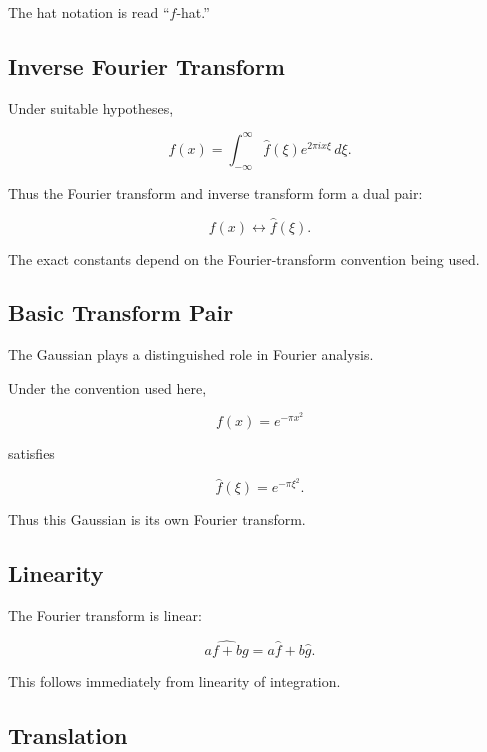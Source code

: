 The hat notation is read ``\(f\)-hat.''

\subsection{Inverse Fourier Transform}
\label{subsec:inverse-fourier-transform}

Under suitable hypotheses,

\[
\boxed{
f(x)
=
\int_{-\infty}^{\infty}
\widehat{f}(\xi)
e^{2\pi i x\xi}
\,d\xi.
}
\]

Thus the Fourier transform and inverse transform form a dual pair:

\[
\boxed{
f(x)
\longleftrightarrow
\widehat{f}(\xi).
}
\]

The exact constants depend on the Fourier-transform convention being used.

\subsection{Basic Transform Pair}
\label{subsec:basic-transform-pair}

The Gaussian plays a distinguished role in Fourier analysis.

Under the convention used here,

\[
\boxed{
f(x)=e^{-\pi x^2}
}
\]

satisfies

\[
\boxed{
\widehat{f}(\xi)
=
e^{-\pi\xi^2}.
}
\]

Thus this Gaussian is its own Fourier transform.

\subsection{Linearity}
\label{subsec:fourier-linearity}

The Fourier transform is linear:

\[
\boxed{
\widehat{af+bg}
=
a\widehat{f}
+
b\widehat{g}.
}
\]

This follows immediately from linearity of integration.

\subsection{Translation}
\label{subsec:fourier-translation}

